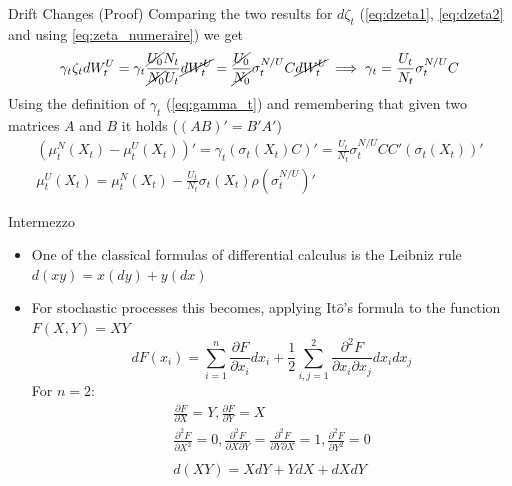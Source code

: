 \documentclass{beamer}
\begin{document}
\begin{frame}{Drift Changes (Proof)}
  Comparing the two results for $d\zeta_t$ (\cref{eq:dzeta1}, \cref{eq:dzeta2} and using \cref{eq:zeta_numeraire}) we get
  \begin{equation*}
    \begin{gathered}
      \gamma_t\zeta_tdW_t^U = \gamma_t\frac{\cancel{U_0}N_t}{\cancel{N_0}U_t}\cancel{dW_t^U}=	\frac{\cancel{U_0}}{\cancel{N_0}}\sigma^{N/U}_tC\cancel{dW_t^U} \implies 
      \gamma_t = \frac{U_t}{N_t}\sigma^{N/U}_tC
    \end{gathered}
  \end{equation*}
  \pause
  Using the definition of $\gamma_t$ (\cref{eq:gamma_t}) and remembering that given two matrices $A$ and $B$ it holds ($(AB)' = B'A'$)
  \begin{equation}
    \begin{gathered}
    (\mu_t^N(X_t)-\mu_t^U(X_t))'= \gamma_t (\sigma_t(X_t)C)'=\frac{U_t}{N_t}\sigma^{N/U}_t CC'(\sigma_t(X_t))'\\
    \mu_t^U(X_t)=\mu_t^N(X_t)-\frac{U_t}{N_t}\sigma_t(X_t)\rho(\sigma^{N/U}_t)'
    \end{gathered}
  \label{eq:gamma}
\end{equation}
\end{frame}

\begin{frame}{Intermezzo}
  \begin{itemize}
  \item One of the classical formulas of differential calculus is the Leibniz rule $d(x y) = x(dy) + y(dx)$
  \item For stochastic processes this becomes, applying It$\hat{o}$'s formula to the function $F(X,Y) = XY$
    \begin{equation*}
      dF(x_i)=\sum_{i=1}^n \frac{\partial F}{\partial x_i}dx_i
      +\frac{1}{2}\sum_{i,j=1}^2 \frac{\partial^2 F}{\partial x_i \partial x_j}dx_i dx_j
    \end{equation*}
  For $n=2$:
    \begin{equation*}
      \begin{gathered}
        \frac{\partial F}{\partial X}=Y,\frac{\partial F}{\partial Y}=X \\
        \frac{\partial^2 F}{\partial X^2}=0,\frac{\partial^2 F}{\partial X\partial Y}=\frac{\partial^2 F}{\partial Y\partial X}=1,\frac{\partial^2 F}{\partial Y^2}=0\\
        \\
        d(XY) = XdY + YdX + dXdY
      \end{gathered}
    \end{equation*}
  \end{itemize}
\end{frame}
\end{document}
